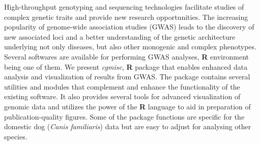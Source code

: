 \documentclass[\main/boa.tex]{subfiles}
\begin{document}
High-throughput genotyping and sequencing technologies facilitate
studies of complex genetic traits and provide new research
opportunities. The increasing popularity of genome-wide association
studies (GWAS) leads to the discovery of new associated loci and a
better understanding of the genetic architecture underlying not only
diseases, but also other monogenic and complex phenotypes. Several
softwares are available for performing GWAS analyses, \textbf{R}
environment being one of them. We present \emph{cgmisc}, \textbf{R}
package that enables enhanced data analysis and visualization of results
from GWAS. The package contains several utilities and modules that
complement and enhance the functionality of the existing software. It
also provides several tools for advanced visualization of genomic data
and utilizes the power of the \textbf{R} language to aid in preparation
of publication-quality figures. Some of the package functions are
specific for the domestic dog (\emph{Canis familiaris}) data but are
easy to adjust for analysing other species.
\end{document}
